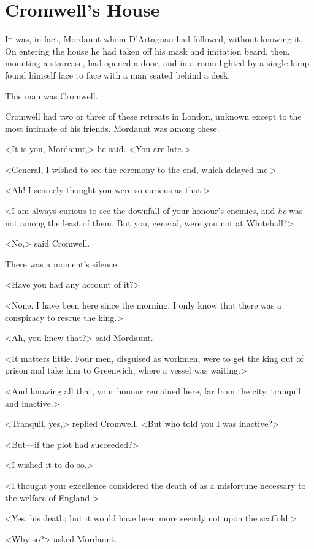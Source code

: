 \chapter{Cromwell's House}

 \lettrine{I}{t} was, in fact, Mordaunt whom D'Artagnan had followed, without knowing it. On entering the house he had taken off his mask and imitation beard, then, mounting a staircase, had opened a door, and in a room lighted by a single lamp found himself face to face with a man seated behind a desk.

This man was Cromwell.

Cromwell had two or three of these retreats in London, unknown except to the most intimate of his friends. Mordaunt was among these.

<It is you, Mordaunt,> he said. <You are late.>

<General, I wished to see the ceremony to the end, which delayed me.>

<Ah! I scarcely thought you were so curious as that.>

<I am always curious to see the downfall of your honour's enemies, and \emph{he} was not among the least of them. But you, general, were you not at Whitehall?>

<No,> said Cromwell.

There was a moment's silence.

<Have you had any account of it?>

<None. I have been here since the morning. I only know that there was a conspiracy to rescue the king.>

<Ah, you knew that?> said Mordaunt.

<It matters little. Four men, disguised as workmen, were to get the king out of prison and take him to Greenwich, where a vessel was waiting.>

<And knowing all that, your honour remained here, far from the city, tranquil and inactive.>

<Tranquil, yes,> replied Cromwell. <But who told you I was inactive?>

<But—if the plot had succeeded?>

<I wished it to do so.>

<I thought your excellence considered the death of   as a misfortune necessary to the welfare of England.>

<Yes, his death; but it would have been more seemly not upon the scaffold.>

<Why so?> asked Mordaunt.


